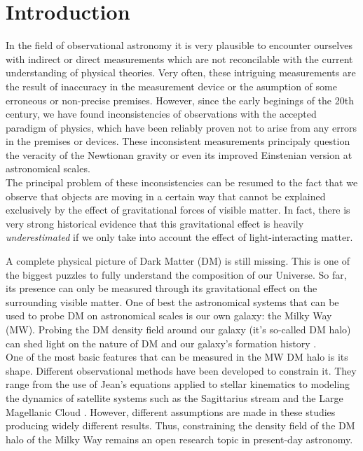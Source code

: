 \chapter{Introduction}

In the field of observational astronomy it is very plausible to encounter ourselves with indirect or direct measurements which are not reconcilable with the current understanding of physical theories. Very often, these intriguing measurements are the result of inaccuracy in the measurement device or the asumption of some erroneous or non-precise premises. However, since the early beginings of the 20th century, we have found inconsistencies of observations with the accepted paradigm of physics, which have been reliably proven not to arise from any errors in the premises or devices. These inconsistent measurements principaly question the veracity of the Newtionan gravity or even its improved Einstenian version at astronomical scales.\\

The principal problem of these inconsistencies can be resumed to the fact that we observe that objects are moving in a certain way that cannot be explained exclusively by the effect of gravitational forces of visible matter. In fact, there is very strong historical evidence that this gravitational effect is heavily \textit{underestimated} if we only take into account the effect of light-interacting matter.      

A complete physical picture of Dark Matter (DM) is still missing.
This is one of the biggest puzzles to fully understand the composition of our Universe.
So far, its presence can only be measured through its gravitational effect on the surrounding visible matter. 
One of best the astronomical systems that can be used to probe DM on astronomical scales is our own galaxy: the Milky Way (MW).
Probing the DM density field around our galaxy (it's so-called DM halo) can shed light on the nature of DM \cite{Nipoti,ReadMoore} and our
galaxy's formation history \cite{Read1,Read2,Vera-Ciro2011}.\\

One of the most basic features that can be measured in the MW DM halo is its shape. 
Different observational methods have been developed to constrain it. 
They range from the use of Jean's equations applied to stellar kinematics \cite{Loebman2012} to modeling the dynamics of satellite
systems such as the Sagittarius stream and the Large Magellanic Cloud \cite{Vera-Ciro2013,Deg2012,LawMajewski2010}. 
However, different assumptions are made in these studies producing widely different results.
Thus, constraining the density field of the DM halo of the Milky Way remains an open research topic in present-day astronomy.\\ 

